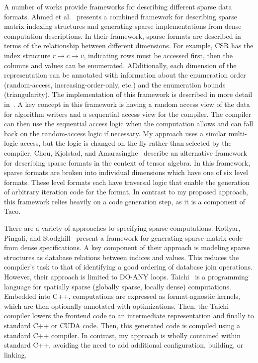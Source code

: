 \documentclass{article}
\begin{document}
A number of works provide frameworks for describing different sparse data formats. 
Ahmed et al.~\cite{ahmed2000framework} presents a combined framework for describing sparse matrix indexing structures and generating sparse implementations from dense computation descriptions.
In their framework, sparse formats are described in terms of the relationship between different dimensions. For example, CSR has the index structure $r \rightarrow c \rightarrow v$, indicating rows must be accessed first, then the columns and values can be enumerated.
ADditionally, each dimension of the representation can be annotated with information about the enumeration order (random-access, increasing-order-only, etc.) and the enumeration bounds (triangularity).
The implementation of this framework is described in more detail in~\cite{mateev2000next}.
A key concept in this framework is having a random access view of the data for algorithm writers and a sequential access view for the compiler.
The compiler can then use the sequential access logic when the computation allows and can fall back on the random-access logic if necessary. 
My approach uses a similar multi-logic access, but the logic is changed on the fly rather than selected by the compiler.
Chou, Kjolstad, and Amarasinghe~\cite{chou2018format} describe an alternative framework for describing sparse formats in the context of tensor algebra. 
In this framework, sparse formats are broken into individual dimensions which have one of six level formats. 
These level formats each have traversal logic that enable the generation of arbitrary iteration code for the format.
In contrast to my proposed approach, this framework relies heavily on a code generation step, as it is a component of Taco.

There are a variety of approaches to specifying sparse computations.
Kotlyar, Pingali, and Stodghill~\cite{kotlyar1997relational} present a framework for generating sparse matrix code from dense specifications.
A key component of their approach is modeling sparse structures as database relations between indices and values. 
This reduces the compiler's task to that of identifying a good ordering of database join operations.
However, their approach is limited to DO-ANY loops.
Taichi~\cite{hu2019taichi} is a programming language for spatially sparse (globally sparse, locally dense) computations.
Embedded into C++, computations are expressed as format-agnostic kernels, which are then optionally annotated with optimizations.
Then, the Taichi compiler lowers the frontend code to an intermediate representation and finally to standard C++ or CUDA code. 
Then, this generated code is compiled using a standard C++ compiler.
In contrast, my approach is wholly contained within standard C++, avoiding the need to add additional configuration, building, or linking.
\end{document}
